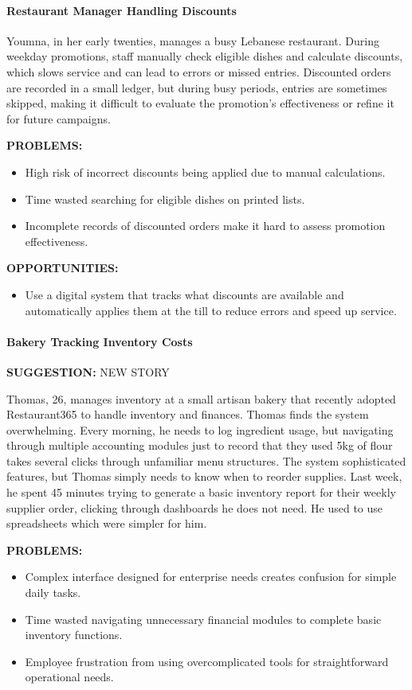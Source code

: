 \documentclass[]{VUMIFTemplateClass}
\newcommand{\suggestioncomment}[1]{%
    \definecolor{lime}{RGB}{50,205,50}%
    \begin{tcolorbox}[colback=lime!15, colframe=lime!60, arc=0pt, outer arc=0pt, boxrule=1pt, left=3pt, right=3pt, top=3pt, bottom=3pt]
        \textbf{\textcolor{lime!70!black}{SUGGESTION:}} #1
    \end{tcolorbox}%
}
\newcommand{\subsubsubsection}[1]{\paragraph{#1}}
\begin{document}
\subsubsubsection{Restaurant Manager Handling Discounts}


Youmna, in her early twenties, manages a busy Lebanese restaurant. During weekday promotions, staff manually check eligible dishes and calculate discounts, which slows service and can lead to errors or missed entries. Discounted orders are recorded in a small ledger, but during busy periods, entries are sometimes skipped, making it difficult to evaluate the promotion’s effectiveness or refine it for future campaigns.

\textbf{PROBLEMS:}

\begin{itemize}
    \item High risk of incorrect discounts being applied due to manual calculations.
    \item Time wasted searching for eligible dishes on printed lists.
    \item Incomplete records of discounted orders make it hard to assess promotion effectiveness.
\end{itemize}
\textbf{OPPORTUNITIES:}
\begin{itemize}
    \item Use a digital system that tracks what discounts are available and
    automatically applies them at the till to reduce errors and speed up service.
\end{itemize}




\subsubsubsection{Bakery Tracking Inventory Costs}
\suggestioncomment{NEW STORY}
Thomas, 26, manages inventory at a small artisan bakery that recently adopted
Restaurant365 to handle inventory and finances. Thomas finds the system
overwhelming. Every morning, he needs to log ingredient usage, but navigating
through multiple accounting modules just to record that they used 5kg of flour
takes several clicks through unfamiliar menu structures. The system sophisticated
features, but Thomas simply needs to know when to reorder supplies. Last week,
he spent 45 minutes trying to generate a basic inventory report for their weekly
supplier order, clicking through dashboards he does not need. He used to use
spreadsheets which were simpler for him.

\textbf{PROBLEMS:}
\begin{itemize}
    \item Complex interface designed for enterprise needs creates confusion for simple daily tasks.
    \item Time wasted navigating unnecessary financial modules to complete basic inventory functions.
    \item Employee frustration from using overcomplicated tools for straightforward operational needs.
\end{itemize}
\end{document}

